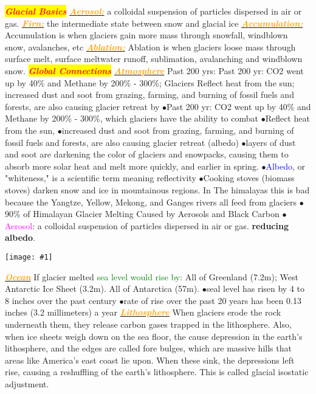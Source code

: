 \documentclass{article}
\author{SBHS Science Olympiad, Gold}
\newcommand{\ddd}{$\bullet$}
\newcommand{\red}[1]{\textcolor{red}{#1}}
\newcommand{\green}[1]{\textcolor{green}{#1}}
\newcommand{\blue}[1]{\textcolor{blue}{#1}}
\newcommand{\pink}[1]{\textcolor{magenta}{#1}}
\newcommand{\orange}[1]{\textcolor{orange}{#1}}
\newcommand{\mysection}[1]{\colorbox{yellow}{\textbf{\textit{\red{#1}}}}}
\newcommand{\mysub}[1]{\underline{\textbf{{\textit{\orange{#1}}}}}}
\newcommand{\mysubsub}[1]{{{\green{#1}}}}
\newcommand{\vocab}[1]{{\pink{#1}}}
\newcommand{\fig}[1]{
	\texttt{[image: \#1]}
}
\begin{document}
	 \tiny
	\begin{multicols*}{4}
	
		\mysection{Glacial Basics}
		\mysub{Aerosol:} a colloidal suspension of particles dispersed in air or gas.
		\mysub{Firn:} the intermediate state between snow and glacial ice
		\mysub{Accumulation:} Accumulation is when glaciers gain more mass through snowfall, windblown snow, avalanches, etc
		\mysub{Ablation:} Ablation is when glaciers loose mass through surface melt, surface meltwater runoff, sublimation, avalanching and windblown snow.
         \mysection{Global Connections}
		\mysub{Atmosphere}
		Past 200 yrs: Past 200 yr: CO2 went up by 40\% and Methane by 200\% - 300\%; Glaciers Reflect heat from the sun; increased dust and soot from grazing, farming, and burning of fossil fuels and forests, are also causing glacier retreat by
		 \ddd Past 200 yr: CO2 went up by 40\% and Methane by 200\% - 300\%, which glaciers have the ability to combat
       \ddd Reflect heat from the sun, 
        \ddd increased dust and soot from grazing, farming, and burning of fossil fuels and forests, are also causing glacier retreat (albedo)
        \ddd layers of dust and soot are darkening the color of glaciers and snowpacks, causing them to absorb more solar heat and melt more quickly, and earlier in spring.
        \ddd \blue{Albedo}, or "whiteness," is a scientific term meaning reflectivity
        \ddd Cooking stoves (biomass stoves) darken snow and ice in mountainous regions. In The himalayas this is bad because the Yangtze, Yellow, Mekong, and Ganges rivers all feed from glaciers
        \ddd 90\% of Himalayan Glacier Melting Caused by Aerosols and Black Carbon
        \ddd \vocab{Aerosol}: a colloidal suspension of particles dispersed in air or gas.
		\textbf{reducing albedo}.
		\fig{NOAASeaLevel}
		\mysub{Ocean} If glacier melted 
		\mysubsub{sea level would rise by: } All of Greenland (7.2m); West Antarctic Ice Sheet (3.2m). All of Antarctica (57m). 
         \ddd seal level has risen by 4 to 8 inches over the past century
         \ddd rate of rise over the past 20 years has been 0.13 inches (3.2 millimeters) a year
		\mysub{Lithosphere} When glaciers erode the rock underneath them, they release carbon gases trapped in the lithosphere. Also, when ice sheets weigh down on the sea floor, the cause depression in the earth's lithosphere, and the edges are called fore bulges, which are massive hills that areas like America's east coast lie upon. When these sink, the depressions left rise, causing a reshuffling of the earth's lithosphere. This is called glacial isostatic adjustment.

\end{multicols*}
\end{document}
